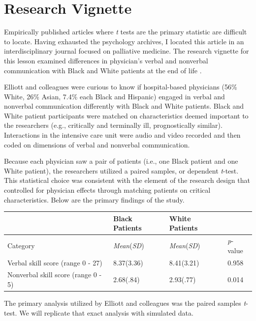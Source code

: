 \documentclass[
  11pt,
]{book}
\begin{document}
\hypertarget{research-vignette-3}{%
\section{Research Vignette}\label{research-vignette-3}}

Empirically published articles where \emph{t} tests are the primary statistic are difficult to locate. Having exhausted the psychology archives, I located this article in an interdisciplinary journal focused on palliative medicine. The research vignette for this lesson examined differences in physician's verbal and nonverbal communication with Black and White patients at the end of life \citep{elliott_differences_2016}.

Elliott and colleagues \citeyearpar{elliott_differences_2016} were curious to know if hospital-based physicians (56\% White, 26\% Asian, 7.4\% each Black and Hispanic) engaged in verbal and nonverbal communication differently with Black and White patients. Black and White patient participants were matched on characteristics deemed important to the researchers (e.g., critically and terminally ill, prognostically similar). Interactions in the intensive care unit were audio and video recorded and then coded on dimensions of verbal and nonverbal communication.

Because each physician saw a pair of patients (i.e., one Black patient and one White patient), the researchers utilized a paired samples, or dependent \emph{t}-test. This statistical choice was consistent with the element of the research design that controlled for physician effects through matching patients on critical characteristics. Below are the primary findings of the study.

\begin{longtable}[]{@{}llll@{}}
\toprule()
& Black Patients & White Patients & \\
\midrule()
\endhead
Category & \emph{Mean}(\emph{SD}) & \emph{Mean}(\emph{SD}) & \emph{p}-value \\
Verbal skill score (range 0 - 27) & 8.37(3.36) & 8.41(3.21) & 0.958 \\
Nonverbal skill score (range 0 - 5) & 2.68(.84) & 2.93(.77) & 0.014 \\
\bottomrule()
\end{longtable}

The primary analysis utilized by Elliott and colleagues \citeyearpar{elliott_differences_2016} was the paired samples \emph{t}-test. We will replicate that exact analysis with simulated data.
\end{document}
